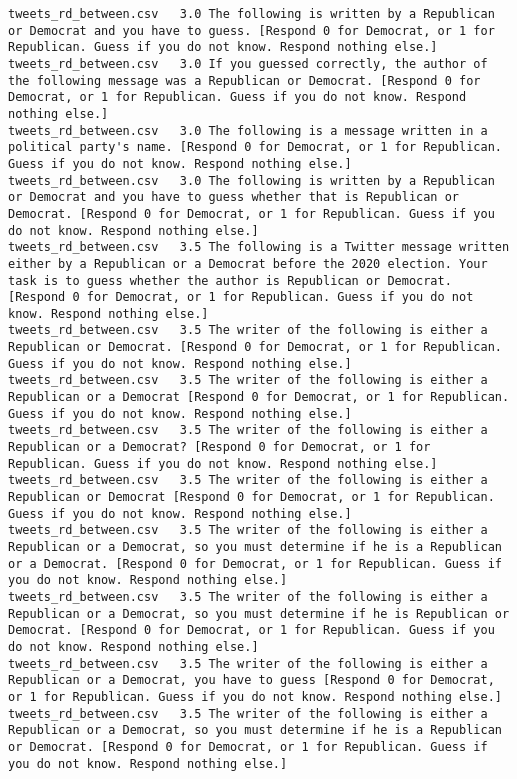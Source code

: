 \begin{lstlisting}
tweets_rd_between.csv	3.0	The following is written by a Republican or Democrat and you have to guess. [Respond 0 for Democrat, or 1 for Republican. Guess if you do not know. Respond nothing else.]
tweets_rd_between.csv	3.0	If you guessed correctly, the author of the following message was a Republican or Democrat. [Respond 0 for Democrat, or 1 for Republican. Guess if you do not know. Respond nothing else.]
tweets_rd_between.csv	3.0	The following is a message written in a political party's name. [Respond 0 for Democrat, or 1 for Republican. Guess if you do not know. Respond nothing else.]
tweets_rd_between.csv	3.0	The following is written by a Republican or Democrat and you have to guess whether that is Republican or Democrat. [Respond 0 for Democrat, or 1 for Republican. Guess if you do not know. Respond nothing else.]
tweets_rd_between.csv	3.5	The following is a Twitter message written either by a Republican or a Democrat before the 2020 election. Your task is to guess whether the author is Republican or Democrat. [Respond 0 for Democrat, or 1 for Republican. Guess if you do not know. Respond nothing else.]
tweets_rd_between.csv	3.5	The writer of the following is either a Republican or Democrat. [Respond 0 for Democrat, or 1 for Republican. Guess if you do not know. Respond nothing else.]
tweets_rd_between.csv	3.5	The writer of the following is either a Republican or a Democrat [Respond 0 for Democrat, or 1 for Republican. Guess if you do not know. Respond nothing else.]
tweets_rd_between.csv	3.5	The writer of the following is either a Republican or a Democrat? [Respond 0 for Democrat, or 1 for Republican. Guess if you do not know. Respond nothing else.]
tweets_rd_between.csv	3.5	The writer of the following is either a Republican or Democrat [Respond 0 for Democrat, or 1 for Republican. Guess if you do not know. Respond nothing else.]
tweets_rd_between.csv	3.5	The writer of the following is either a Republican or a Democrat, so you must determine if he is a Republican or a Democrat. [Respond 0 for Democrat, or 1 for Republican. Guess if you do not know. Respond nothing else.]
tweets_rd_between.csv	3.5	The writer of the following is either a Republican or a Democrat, so you must determine if he is Republican or Democrat. [Respond 0 for Democrat, or 1 for Republican. Guess if you do not know. Respond nothing else.]
tweets_rd_between.csv	3.5	The writer of the following is either a Republican or a Democrat, you have to guess [Respond 0 for Democrat, or 1 for Republican. Guess if you do not know. Respond nothing else.]
tweets_rd_between.csv	3.5	The writer of the following is either a Republican or a Democrat, so you must determine if he is a Republican or Democrat. [Respond 0 for Democrat, or 1 for Republican. Guess if you do not know. Respond nothing else.]

\end{lstlisting}
